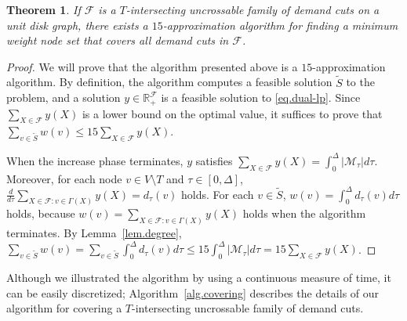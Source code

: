 \documentclass[11pt]{article}
\newcommand{\Rset}{\mathbb{R}}
\newcommand{\Ffam}{\mathcal{F}}
\newcommand{\Mfam}{\mathcal{M}}
\newtheorem{theorem}{Theorem}
\begin{document}
  \begin{theorem}
   \label{thm.coveringuncross}
  If $\Ffam$ is a $T$-intersecting uncrossable family of demand cuts on a unit disk graph,
  there exists a $15$-approximation algorithm for finding a minimum
  weight node set that covers all demand cuts in $\Ffam$.
  \end{theorem}
  \begin{proof}
  We will prove that the algorithm presented above is a $15$-approximation
   algorithm.
   By definition, the algorithm computes a feasible solution
   $\tilde{S}$ to the problem, and a solution $y \in \Rset_+^{\Ffam}$
  is a feasible solution to \eqref{eq.dual-lp}.
   Since $\sum_{X \in \Ffam}y(X)$ is a lower bound on the optimal value, it suffices to prove that $\sum_{v \in \tilde{S}}w(v)
   \leq 15\sum_{X \in \Ffam}y(X)$.
   
   When the increase phase terminates,
   $y$ satisfies
 $\sum_{X \in \Ffam}y(X)=
 \int_0^{\Delta} |\Mfam_{\tau}| d\tau$.
   Moreover,
   for each node $v \in V \setminus T$ and $\tau \in [0,\Delta]$,
   $\frac{d}{d\tau} \sum_{X \in \Ffam\colon v \in
   \Gamma(X)}y(X)=d_{\tau}(v)$ holds.
   For each $v \in \tilde{S}$,
   $w(v) = \int_{0}^{\Delta} d_{\tau}(v) d\tau$ holds,
   because $w(v)=\sum_{X \in \Ffam \colon v \in \Gamma(X)}y(X)$ holds
 when the algorithm terminates.
 By Lemma~\ref{lem.degree},
 $\sum_{v \in \tilde{S}}w(v)
 = \sum_{v \in \tilde{S}}\int_0^{\Delta} d_{\tau}(v)d\tau
 \leq 15 \int_0^{\Delta} |\Mfam_{\tau}| d\tau = 15\sum_{X \in \Ffam}y(X)$.
  \end{proof}

    Although we illustrated the algorithm by using a continuous measure of time,
  it can be easily discretized;
  Algorithm~\ref{alg.covering} 
  describes the details of our algorithm
  for covering a $T$-intersecting uncrossable family of demand cuts.
\end{document}
